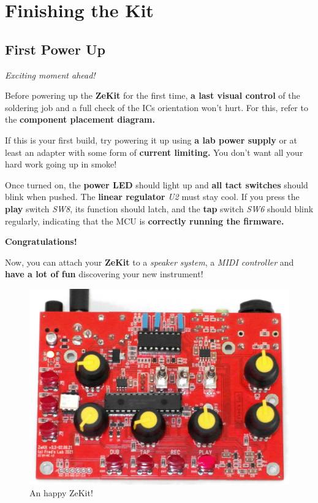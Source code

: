 \documentclass{scrartcl}
\begin{document}
\pagebreak
\section{Finishing the Kit}

\subsection{First Power Up}
\Large
\emph{Exciting moment ahead!}
\normalsize

Before powering up the \textbf{ZeKit} for the first time, \textbf{a last visual control} of the soldering job and a full check of the ICs orientation won't hurt.
For this, refer to the \textbf{component placement diagram.}

If this is your first build, try powering it up using \textbf{a lab power supply} or at least an adapter with some form of \textbf{current limiting.}
You don't want all your hard work going up in smoke!

Once turned on, the \textbf{power LED} should light up and \textbf{all tact switches} should blink when pushed. The \textbf{linear regulator} \emph{U2} must stay cool.
If you press the \textbf{play} switch \emph{SW8}, its function should latch, and the \textbf{tap} switch \emph{SW6} should blink regularly, indicating that the MCU is \textbf{correctly running the firmware.}

\vspace{0.5cm}
\textbf{Congratulations!}

Now, you can attach your \textbf{ZeKit} to a \emph{speaker system}, a \emph{MIDI controller} and \textbf{have a lot of fun} discovering your new instrument!

\begin{figure}[!ht]
    \begin{center}
        \includegraphics[scale=0.28]{assets/zekit-happy.jpg}
        \caption{An happy ZeKit!}
    \end{center}
\end{figure}
\end{document}
